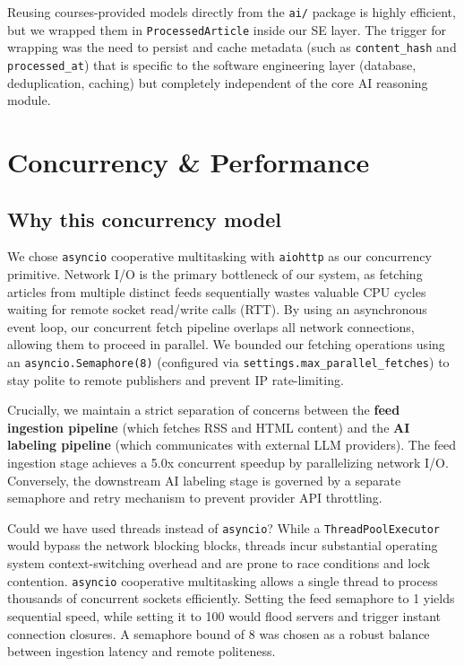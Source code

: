 \documentclass[11pt,a4paper]{article}
\begin{document}
Reusing courses-provided models directly from the \texttt{ai/} package is highly efficient, but we wrapped them in \texttt{ProcessedArticle} inside our SE layer. The trigger for wrapping was the need to persist and cache metadata (such as \texttt{content\_hash} and \texttt{processed\_at}) that is specific to the software engineering layer (database, deduplication, caching) but completely independent of the core AI reasoning module.

\section{Concurrency \& Performance}\label{sec:concurrency}
\subsection{Why this concurrency model}

We chose \texttt{asyncio} cooperative multitasking with \texttt{aiohttp} as our concurrency primitive. Network I/O is the primary bottleneck of our system, as fetching articles from multiple distinct feeds sequentially wastes valuable CPU cycles waiting for remote socket read/write calls (RTT). By using an asynchronous event loop, our concurrent fetch pipeline overlaps all network connections, allowing them to proceed in parallel. We bounded our fetching operations using an \texttt{asyncio.Semaphore(8)} (configured via \texttt{settings.max\_parallel\_fetches}) to stay polite to remote publishers and prevent IP rate-limiting.

Crucially, we maintain a strict separation of concerns between the \textbf{feed ingestion pipeline} (which fetches RSS and HTML content) and the \textbf{AI labeling pipeline} (which communicates with external LLM providers). The feed ingestion stage achieves a 5.0x concurrent speedup by parallelizing network I/O. Conversely, the downstream AI labeling stage is governed by a separate semaphore and retry mechanism to prevent provider API throttling.

Could we have used threads instead of \texttt{asyncio}? While a \texttt{ThreadPoolExecutor} would bypass the network blocking blocks, threads incur substantial operating system context-switching overhead and are prone to race conditions and lock contention. \texttt{asyncio} cooperative multitasking allows a single thread to process thousands of concurrent sockets efficiently. Setting the feed semaphore to 1 yields sequential speed, while setting it to 100 would flood servers and trigger instant connection closures. A semaphore bound of 8 was chosen as a robust balance between ingestion latency and remote politeness.
\end{document}
